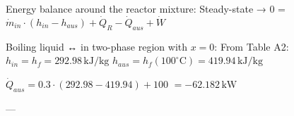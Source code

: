 Energy balance around the reactor mixture:  
Steady-state → 0 = \( \dot{m}_{in} \cdot (h_{in} - h_{aus}) + \dot{Q}_R - \dot{Q}_{aus} + \dot{W} \)  

Boiling liquid ↔ in two-phase region with \( x = 0 \):  
From Table A2:  
\( h_{in} = h_f = 292.98 \, \text{kJ/kg} \)  
\( h_{aus} = h_f(100^\circ \text{C}) = 419.94 \, \text{kJ/kg} \)  

\( \dot{Q}_{aus} = 0.3 \cdot (292.98 - 419.94) + 100 \)  
\( = -62.182 \, \text{kW} \)  

---